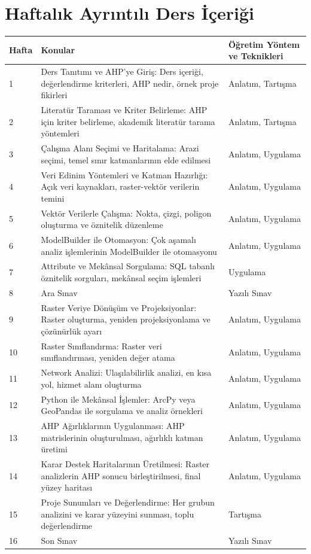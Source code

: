 \documentclass[10pt]{article}
\begin{document}
\section*{Haftalık Ayrıntılı Ders İçeriği}
\begin{tabularx}{\textwidth}{|l|p{}|X|}
\hline
\textbf{Hafta} & \textbf{Konular} & \textbf{Öğretim Yöntem ve Teknikleri} \\
\hline
1 & Ders Tanıtımı ve AHP'ye Giriş: Ders içeriği, değerlendirme kriterleri, AHP nedir, örnek proje fikirleri & Anlatım, Tartışma \\
\hline
2 & Literatür Taraması ve Kriter Belirleme: AHP için kriter belirleme, akademik literatür tarama yöntemleri & Anlatım, Tartışma \\
\hline
3 & Çalışma Alanı Seçimi ve Haritalama: Arazi seçimi, temel sınır katmanlarının elde edilmesi & Anlatım, Uygulama \\
\hline
4 & Veri Edinim Yöntemleri ve Katman Hazırlığı: Açık veri kaynakları, raster-vektör verilerin temini & Anlatım, Uygulama \\
\hline
5 & Vektör Verilerle Çalışma: Nokta, çizgi, poligon oluşturma ve öznitelik düzenleme & Anlatım, Uygulama \\
\hline
6 & ModelBuilder ile Otomasyon: Çok aşamalı analiz işlemlerinin ModelBuilder ile otomasyonu & Anlatım, Uygulama \\
\hline
7 & Attribute ve Mekânsal Sorgulama: SQL tabanlı öznitelik sorguları, mekânsal seçim işlemleri & Uygulama \\
\hline
8 & Ara Sınav & Yazılı Sınav \\
\hline
9 & Raster Veriye Dönüşüm ve Projeksiyonlar: Raster oluşturma, yeniden projeksiyonlama ve çözünürlük ayarı & Anlatım, Uygulama \\
\hline
10 & Raster Sınıflandırma: Raster veri sınıflandırması, yeniden değer atama & Anlatım, Uygulama \\
\hline
11 & Network Analizi: Ulaşılabilirlik analizi, en kısa yol, hizmet alanı oluşturma & Anlatım, Uygulama \\
\hline
12 & Python ile Mekânsal İşlemler: ArcPy veya GeoPandas ile sorgulama ve analiz örnekleri & Anlatım, Uygulama \\
\hline
13 & AHP Ağırlıklarının Uygulanması: AHP matrislerinin oluşturulması, ağırlıklı katman üretimi & Anlatım, Uygulama \\
\hline
14 & Karar Destek Haritalarının Üretilmesi: Raster analizlerin AHP sonucu birleştirilmesi, final yüzey haritası & Anlatım, Uygulama \\
\hline
15 & Proje Sunumları ve Değerlendirme: Her grubun analizini ve karar yüzeyini sunması, toplu değerlendirme & Tartışma \\
\hline
16 & Son Sınav & Yazılı Sınav \\
\hline
\end{tabularx}
\end{document}
